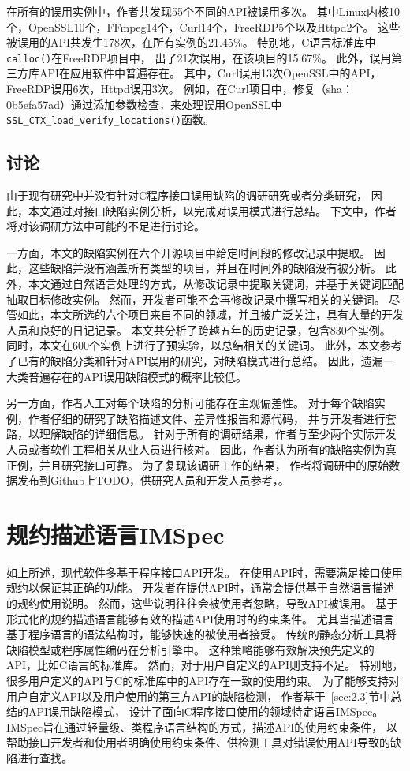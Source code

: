 在所有的误用实例中，作者共发现55个不同的API被误用多次。
其中Linux内核10个，OpenSSL10个，FFmpeg14个，Curl14个，FreeRDP5个以及Httpd2个。
这些被误用的API共发生178次，在所有实例的21.45\%。
特别地，C语言标准库中\texttt{calloc()}在FreeRDP项目中，
出了21次误用，在该项目的15.67\%。
此外，误用第三方库API在应用软件中普遍存在。
其中，Curl误用13次OpenSSL中的API，FreeRDP误用6次，Httpd误用3次。
例如，在Curl项目中，修复（sha：0b5efa57ad）通过添加参数检查，来处理误用OpenSSL中
\texttt{SSL\_CTX\_load\_verify\_locations()}函数。


\subsection{讨论}
由于现有研究中并没有针对C程序接口误用缺陷的调研研究或者分类研究，
因此，本文通过对接口缺陷实例分析，以完成对误用模式进行总结。
下文中，作者将对该调研方法中可能的不足进行讨论。

一方面，本文的缺陷实例在六个开源项目中给定时间段的修改记录中提取。
因此，这些缺陷并没有涵盖所有类型的项目，并且在时间外的缺陷没有被分析。
此外，本文通过自然语言处理的方式，从修改记录中提取关键词，并基于关键词匹配抽取目标修改实例。
然而，开发者可能不会再修改记录中撰写相关的关键词。
尽管如此，本文所选的六个项目来自不同的领域，并且被广泛关注，具有大量的开发人员和良好的日记记录。
本文共分析了跨越五年的历史记录，包含830个实例。
同时，本文在600个实例上进行了预实验，以总结相关的关键词。
此外，本文参考了已有的缺陷分类和针对API误用的研究，对缺陷模式进行总结。
因此，遗漏一大类普遍存在的API误用缺陷模式的概率比较低。

另一方面，作者人工对每个缺陷的分析可能存在主观偏差性。
对于每个缺陷实例，作者仔细的研究了缺陷描述文件、差异性报告和源代码，
并与开发者进行套路，以理解缺陷的详细信息。
针对于所有的调研结果，作者与至少两个实际开发人员或者软件工程相关从业人员进行核对。
因此，作者认为所有的缺陷实例为真正例，并且研究接口可靠。
为了复现该调研工作的结果，
作者将调研中的原始数据发布到Github上TODO，供研究人员和开发人员参考，。

\section{规约描述语言IMSpec}
\label{sec:2.4}
如上所述，现代软件多基于程序接口API开发。
在使用API时，需要满足接口使用规约以保证其正确的功能。
开发者在提供API时，通常会提供基于自然语言描述的规约使用说明。
然而，这些说明往往会被使用者忽略，导致API被误用。
基于形式化的规约描述语言能够有效的描述API使用时的约束条件。
尤其当描述语言基于程序语言的语法结构时，能够快速的被使用者接受。
传统的静态分析工具将缺陷模型或程序属性编码在分析引擎中。
这种策略能够有效解决预先定义的API，比如C语言的标准库。
然而，对于用户自定义的API则支持不足。
特别地，很多用户定义的API与C的标准库中的API存在一致的使用约束。
为了能够支持对用户自定义API以及用户使用的第三方API的缺陷检测，
作者基于~\ref{sec:2.3}节中总结的API误用缺陷模式，
设计了面向C程序接口使用的领域特定语言IMSpec。
IMSpec旨在通过轻量级、类程序语言结构的方式，描述API的使用约束条件，
以帮助接口开发者和使用者明确使用约束条件、供检测工具对错误使用API导致的缺陷进行查找。

